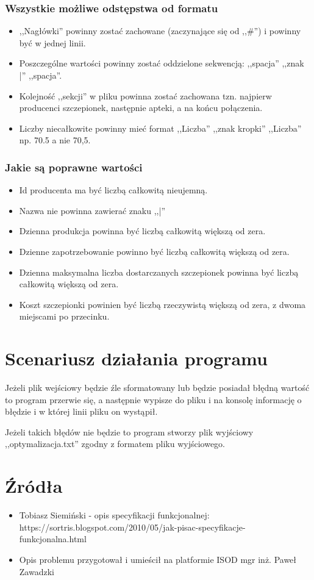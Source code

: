 \documentclass{article}
\begin{document}
\subsubsection{Wszystkie możliwe odstępstwa od formatu}
\begin{itemize}
    \item ,,Nagłówki'' powinny zostać zachowane (zaczynające się od ,,\#'') i powinny być w jednej linii.
    \item Poszczególne wartości powinny zostać oddzielone sekwencją: ,,spacja'' ,,znak |'' ,,spacja''.
    \item Kolejność ,,sekcji'' w pliku powinna zostać zachowana tzn. najpierw producenci szczepionek, następnie apteki, a na końcu połączenia.
    \item Liczby niecałkowite powinny mieć format ,,Liczba'' ,,znak kropki'' ,,Liczba'' np. 70.5 a nie 70,5.
\end{itemize}

\subsubsection{Jakie są poprawne wartości}
\begin{itemize}
    \item Id producenta ma być liczbą całkowitą nieujemną.
    \item Nazwa nie powinna zawierać znaku ,,|''
    \item Dzienna produkcja powinna być liczbą całkowitą większą od zera.
    \item Dzienne zapotrzebowanie powinno być liczbą całkowitą większą od zera.
    \item Dzienna maksymalna liczba dostarczanych szczepionek powinna być liczbą całkowitą większą od zera.
    \item Koszt szczepionki powinien być liczbą rzeczywistą większą od zera, z dwoma miejscami po przecinku.
\end{itemize}

\section{Scenariusz działania programu}
Jeżeli plik wejściowy będzie źle sformatowany lub będzie posiadał błędną wartość to program przerwie się, a następnie wypisze do pliku i na konsolę informację o błędzie i w której linii pliku on wystąpił.

Jeżeli takich błędów nie będzie to program stworzy plik wyjściowy ,,optymalizacja.txt'' zgodny z formatem pliku wyjściowego.

\section{Źródła}

\begin{itemize}
    \item Tobiasz Siemiński - opis specyfikacji funkcjonalnej: https://sortris.blogspot.com/2010/05/jak-pisac-specyfikacje-funkcjonalna.html
    
    \item Opis problemu przygotował i umieścił na platformie ISOD mgr inż. Paweł Zawadzki
    
\end{itemize}
\end{document}
